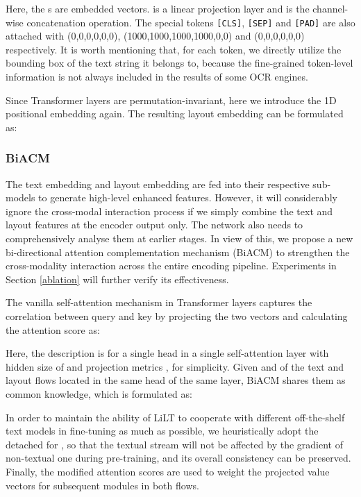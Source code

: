 \documentclass[11pt]{article}
\begin{document}
Here, the s are embedded vectors.  is a linear projection layer and  is the channel-wise concatenation operation. The special tokens \texttt{[CLS]}, \texttt{[SEP]} and \texttt{[PAD]} are  also  attached with (0,0,0,0,0,0), (1000,1000,1000,1000,0,0) and (0,0,0,0,0,0) respectively.
It is worth mentioning that,  for each token, we directly utilize the bounding box of the text string it belongs to, because the fine-grained  token-level information is not always included in the results of some OCR engines.

Since Transformer layers are permutation-invariant, here we introduce the  1D positional embedding again. The resulting layout embedding  can be formulated as:

\subsubsection{BiACM}
The text embedding  and layout embedding  are fed into their respective sub-models to generate high-level enhanced features. 
However, it will considerably ignore 
the cross-modal interaction process
if we simply combine the text and layout features at the encoder output only.
The network also needs to comprehensively analyse them at earlier stages. 
In view of this, we propose a new bi-directional attention complementation mechanism (BiACM) to  strengthen the cross-modality interaction across the entire encoding pipeline. Experiments in Section \ref{ablation} will further verify its effectiveness.

The vanilla self-attention mechanism in Transformer layers  captures the correlation between query  and key  by projecting the two vectors and calculating the attention score  as:
 
Here, the description is for a single head in a single self-attention layer with hidden size of  and projection metrics ,  for simplicity. 
Given  and  of the text and layout flows located in the same head of the same layer, BiACM shares them as  common knowledge,  which is  formulated as:

In order to maintain the ability of LiLT to cooperate with different off-the-shelf text models in fine-tuning  as much as possible, we heuristically adopt the detached  for , so that the  textual stream  will not be affected by the gradient of  non-textual one during pre-training, and its overall consistency can be preserved. Finally, the modified attention scores are used to weight the projected value vectors for subsequent modules in both flows.
\end{document}
